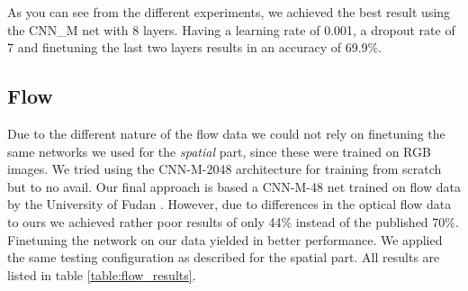 
As you can see from the different experiments, we achieved the best result using the CNN\_M net with 8 layers.
Having a learning rate of 0.001, a dropout rate of 7 and finetuning the last two layers results in an accuracy of 69.9\%.



\subsection{Flow}
\label{subsec:flow}
Due to the different nature of the flow data we could not rely on finetuning the same networks we used for the \emph{spatial} part, since these were trained on RGB images.
We tried using the CNN-M-2048 architecture for training from scratch but to no avail.
Our final approach is based a CNN-M-48 net trained on flow data by the University of Fudan \cite{wu2015modeling}.
However, due to differences in the optical flow data to ours we achieved rather poor results of only 44\% instead of the published 70\%. 
Finetuning the network on our data yielded in better performance.
We applied the same testing configuration as described for the spatial part.
All results are listed in table \ref{table:flow_results}.

